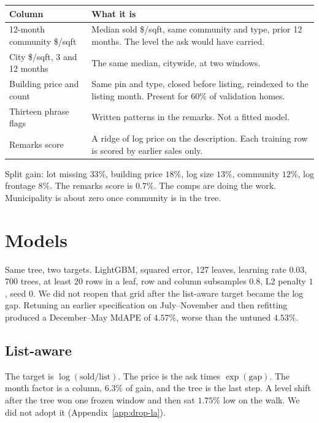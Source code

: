 \documentclass[11pt]{article}
\begin{document}
\begin{center}
\small
\begin{tabular}{p{4.4cm}p{11.2cm}}
\toprule
Column & What it is \\
\midrule
12-month community \$/sqft & Median sold \$/sqft, same community and type, prior 12 months. The level the ask would have carried. \\
City \$/sqft, 3 and 12 months & The same median, citywide, at two windows. \\
Building price and count & Same pin and type, closed before listing, reindexed to the listing month. Present for \(60\%\) of validation homes. \\
Thirteen phrase flags & Written patterns in the remarks. Not a fitted model. \\
Remarks score & A ridge of log price on the description. Each training row is scored by earlier sales only. \\
\bottomrule
\end{tabular}
\end{center}

Split gain: lot missing \(33\%\), building price \(18\%\), log size \(13\%\), community \(12\%\), log frontage \(8\%\). The remarks score is \(0.7\%\). The comps are doing the work. Municipality is about zero once community is in the tree.

\section{Models}

Same tree, two targets. LightGBM, squared error, 127 leaves, learning rate \(0.03\), 700 trees, at least 20 rows in a leaf, row and column subsamples \(0.8\), L2 penalty \(1\), seed \(0\). We did not reopen that grid after the list-aware target became the log gap. Retuning an earlier specification on July--November and then refitting produced a December--May MdAPE of \(4.57\%\), worse than the untuned \(4.53\%\).

\subsection{List-aware}

The target is \(\log(\mathrm{sold}/\mathrm{list})\). The price is the ask times \(\exp(\mathrm{gap})\). The month factor is a column, \(6.3\%\) of gain, and the tree is the last step. A level shift after the tree won one frozen window and then sat \(1.75\%\) low on the walk. We did not adopt it (Appendix~\ref{app:drop-la}).
\end{document}
